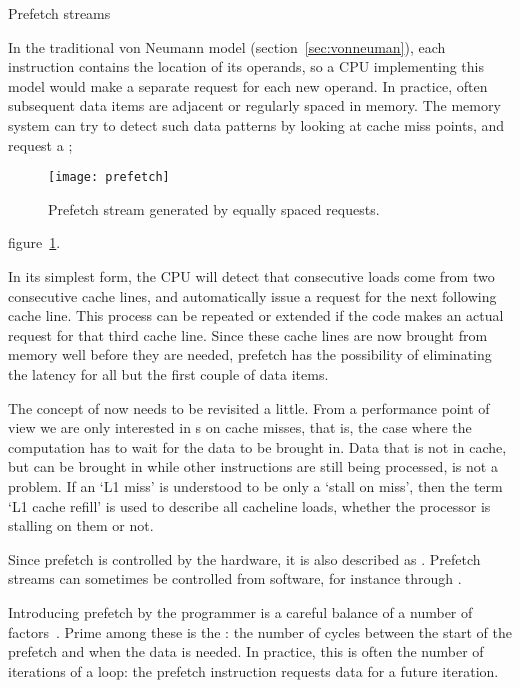  {Prefetch streams}
\label{sec:prefetch}

In the traditional von Neumann model (section~\ref{sec:vonneuman}),
each instruction contains the location of its operands, so a \ac{CPU}
implementing this model would make a separate request for each new
operand. In practice, often subsequent data items are adjacent or
regularly spaced in memory. The memory system can try to detect such
data patterns by looking at cache miss points,
and request a ;
\begin{figure}[ht]
  \texttt{[image: prefetch]}
  \caption{Prefetch stream generated by equally spaced requests.}
  \label{fig:prefetch}
\end{figure}
figure~\ref{fig:prefetch}.

In its simplest form, the \ac{CPU} will detect that consecutive loads come
from two consecutive cache lines, and automatically issue a request
for the next following cache line. This process can be repeated or
extended if the code makes an actual request for that third cache
line. Since these cache lines are now brought from memory well before
they are needed, prefetch has the possibility of eliminating the
latency for all but the first couple of data items.

The concept of  now needs to be revisited a
little. From a performance point of view we are only interested in
s on cache misses, that is, the case where the
computation has to wait for the data to be brought in. Data that is
not in cache, but can be brought in while other instructions are still
being processed, is not a problem. If an `L1 miss' is understood to be
only a `stall on miss', then the term `L1 cache refill' is used to
describe all cacheline loads, whether the processor is stalling on
them or not.

Since prefetch is controlled by the hardware, it is also described as
.
Prefetch streams can sometimes be
controlled from software, for instance through .

Introducing prefetch by the programmer is a careful balance of a
number of factors~\cite{Guttman:prefetchKNC}. Prime among these is the
: the number of cycles between the
start of the prefetch and when the data is needed. In practice, this
is often the number of iterations of a loop: the prefetch instruction
requests data for a future iteration.

